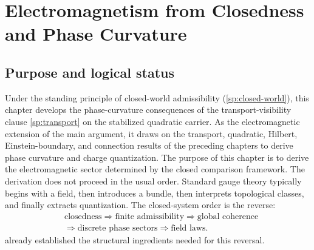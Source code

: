 \chapter{Electromagnetism from Closedness and Phase Curvature}
\label{ch:em}
\section{Purpose and logical status}
\label{sec:em-purpose}
Under the standing principle of closed-world admissibility
(\cref{sp:closed-world}), this chapter develops the phase-curvature
consequences of the transport-visibility clause
\cref{sp:transport} on the stabilized quadratic carrier.
As the electromagnetic extension of the main argument, it draws on the
transport, quadratic, Hilbert, Einstein-boundary, and connection results
of the preceding chapters to derive phase curvature and charge
quantization.
The purpose of this chapter is to derive the electromagnetic sector
determined by the closed comparison framework.
The derivation does not proceed in the usual order.
Standard gauge theory typically begins with a field, then introduces a
bundle, then interprets topological classes, and finally extracts
quantization.
The closed-system order is the reverse:
\[
	\begin{aligned}
		 & \text{closedness}
		\Longrightarrow
		\text{finite admissibility}
		\Longrightarrow
		\text{global coherence}
		\\
		 & \Longrightarrow
		\text{discrete phase sectors}
		\Longrightarrow
		\text{field laws}.
	\end{aligned}
\]
already established the structural ingredients
needed for this reversal.
